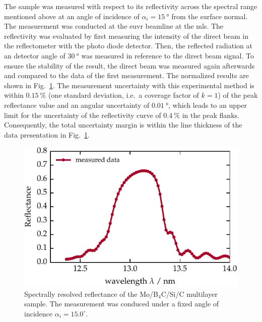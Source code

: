 The sample was measured with respect to its reflectivity across the spectral range mentioned above at an angle of incidence of $\alpha_i=\SI{15}{\degree}$ from the surface normal. The measurement was conducted at the \gls{euvr} beamline at the \gls{mls}. The reflectivity was evaluated by first measuring the intensity of the direct beam in the reflectometer with the photo diode detector. Then, the reflected radiation at an detector angle of $\SI{30}{\degree}$ was measured in reference to the direct beam signal. To ensure the stability of the result, the direct beam was measured again afterwards and compared to the data of the first measurement. The normalized results are shown in Fig.~\ref{ch_spec:fig_ptb17_reflectance_AOI_15}. The measurement uncertainty with this experimental method is within $\SI{0.15}{\percent}$ (one standard deviation, i.e.~a coverage factor of $k=1$) of the peak reflectance value \cite{scholze_high-accuracy_2003} and an angular uncertainty of $\SI{0.01}{\degree}$, which leads to an upper limit for the uncertainty of the reflectivity curve of $\SI{0.4}{\percent}$ in the peak flanks. Consequently, the total uncertainty margin is within the line thickness of the data presentation in Fig.~\ref{ch_spec:fig_ptb17_reflectance_AOI_15}.
\begin{figure}[htbp]
\centering
\includegraphics{img/PTB17_reflectance_AOI_15}
\caption[Spectrally resolved reflectance of the Mo/B$_4$C/Si/C multilayer sample.]{Spectrally resolved reflectance of the Mo/B$_4$C/Si/C multilayer sample. The measurement was conduced under a fixed angle of incidence $\alpha_i = 15.0^\circ$.}
\label{ch_spec:fig_ptb17_reflectance_AOI_15}
\end{figure}

